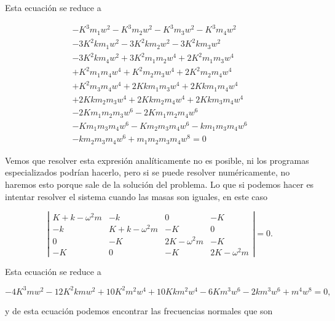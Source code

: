 \documentclass[a4paper,10pt]{article}
\numberwithin{equation}{section}
\begin{document}
Esta ecuación se reduce a 

\begin{align}
 - K^{3} m_{1} w^{2} - K^{3} m_{2} w^{2} - K^{3} m_{3} w^{2} - K^{3} m_{4} w^{2} \\
 - 3 K^{2} k m_{1} w^{2} - 3 K^{2} k m_{2} w^{2} - 3 K^{2} k m_{3} w^{2} \\
 - 3 K^{2} k m_{4} w^{2} + 3 K^{2} m_{1} m_{2} w^{4} + 2 K^{2} m_{1} m_{3} w^{4}\\
 + K^{2} m_{1} m_{4} w^{4} + K^{2} m_{2} m_{3} w^{4} + 2 K^{2} m_{2} m_{4} w^{4} \\
 + K^{2} m_{3} m_{4} w^{4} + 2 K k m_{1} m_{3} w^{4} + 2 K k m_{1} m_{4} w^{4} \\
 + 2 K k m_{2} m_{3} w^{4} + 2 K k m_{2} m_{4} w^{4} + 2 K k m_{3} m_{4} w^{4} \\
 - 2 K m_{1} m_{2} m_{3} w^{6} - 2 K m_{1} m_{2} m_{4} w^{6} \\
 - K m_{1} m_{3} m_{4} w^{6} - K m_{2} m_{3} m_{4} w^{6} - k m_{1} m_{3} m_{4} w^{6} \\
 - k m_{2} m_{3} m_{4} w^{6} + m_{1} m_{2} m_{3} m_{4} w^{8} = 0
\end{align}

Vemos que resolver esta expresión analíticamente no es posible, ni 
los programas especializados podrían hacerlo, pero si se puede resolver numéricamente,
no haremos esto porque sale de la solución del problema. Lo que si podemos hacer 
es intentar resolver el sistema cuando las masas son iguales, en este caso

\begin{equation}
 \left|\begin{matrix}
      K+k - \omega^2m & -k & 0 & -K \\
      -k & K+k - \omega^2m & - K & 0 \\
      0 & - K & 2K -  \omega^2m & - K \\
      -K & 0 & - K & 2K -  \omega^2m
     \end{matrix}\right| = 0.
\end{equation}


Esta ecuación se reduce a 

\begin{equation}
 - 4 K^{3} m w^{2} - 12 K^{2} k m w^{2} + 10 K^{2} m^{2} w^{4} + 
 10 K k m^{2} w^{4} - 6 K m^{3} w^{6} - 2 k m^{3} w^{6} + m^{4} w^{8} = 0,
\end{equation}

y de esta ecuación podemos encontrar las frecuencias normales que son
\end{document}
